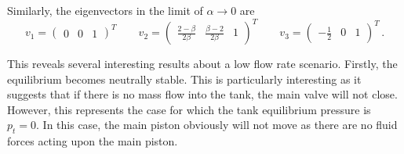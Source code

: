 Similarly, the eigenvectors in the limit of $\alpha \rightarrow 0$ are
~ %
\begin{equation*}
    v_1 = \begin{pmatrix}
    0 & 0 & 1
    \end{pmatrix}^T \qquad
    v_2 = \begin{pmatrix}
    \frac{2 - \beta}{2\beta} & \frac{\beta - 2}{2\beta} & 1
    \end{pmatrix}^T \qquad
    v_3 = \begin{pmatrix}
    - \frac{1}{2} & 0 & 1
    \end{pmatrix}^T \, .
\end{equation*}

This reveals several interesting results about a low flow rate scenario. Firstly, the equilibrium becomes neutrally stable. This is particularly interesting as it suggests that if there is no mass flow into the tank, the main valve will not close. However, this represents the case for which the tank equilibrium pressure is $p_t = 0$. In this case, the main piston obviously will not move as there are no fluid forces acting upon the main piston.

